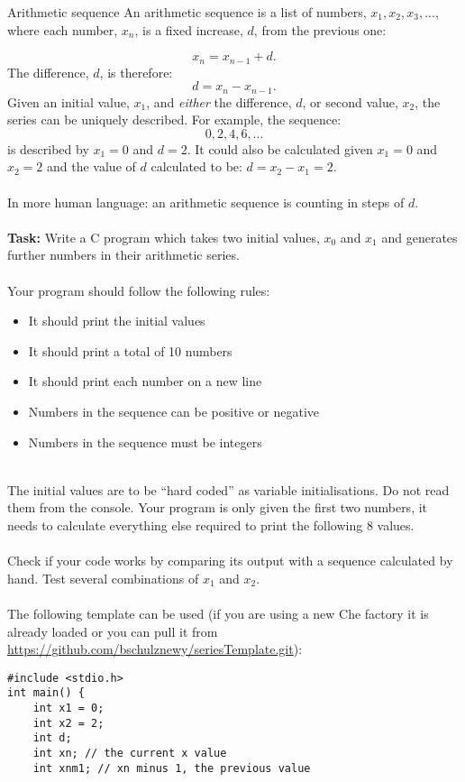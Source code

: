 \documentclass{lab}
\begin{document}
\begin{task}{Arithmetic sequence}{}
An arithmetic sequence is a list of numbers, $x_1, x_2, x_3, ...$, where each number, $x_n$, is a fixed increase, $d$, from the previous one:

\begin{equation}
x_{n} = x_{n-1} + d.
\end{equation}
The difference, $d$, is therefore:
\begin{equation}
d = x_n - x_{n-1}.
\end{equation}
Given an initial value, $x_1$, and \textit{either} the difference, $d$, or second value, $x_2$, the series can be uniquely described.
For example, the sequence:
\begin{equation}
0, 2, 4, 6, ...
\end{equation}
is described by $x_1 = 0$ and $d = 2$. It could also be calculated given $x_1 = 0$ and $x_2 = 2$ and the value of $d$ calculated to be: $d = x_2 - x_1 = 2$.
\\ \\
In more human language: an arithmetic sequence is counting in steps of $d$.
\\ \\
\textbf{Task:} Write a C program which takes two initial values, $x_0$ and $x_1$ and generates further numbers in their arithmetic series.
\\ \\
Your program should follow the following rules:
\begin{itemize}
\item It should print the initial values
\item It should print a total of 10 numbers
\item It should print each number on a new line
\item Numbers in the sequence can be positive or negative
\item Numbers in the sequence must be integers
\end{itemize}
~ \\
The initial values are to be ``hard coded'' as variable initialisations. Do not read them from the console. Your program is only given the first two numbers, it needs to calculate everything else required to print the following 8 values.
\\ \\
Check if your code works by comparing its output with a sequence calculated by hand. Test several combinations of $x_1$ and $x_2$.
\\ \\
The following template can be used (if you are using a new Che factory it is already loaded or you can pull it from \url{https://github.com/bschulznewy/seriesTemplate.git}):
\begin{lstlisting}[style=pseudo]
#include <stdio.h>
int main() {
	int x1 = 0;
	int x2 = 2;
	int d;
	int xn; // the current x value
	int xnm1; // xn minus 1, the previous value


\end{lstlisting}
\end{task}
\end{document}
